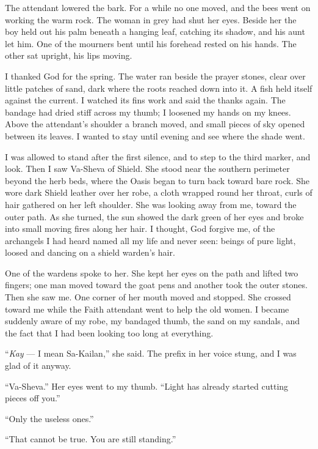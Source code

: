 The attendant lowered the bark. For a while no one moved, and the bees went on working the warm rock. The woman in grey had shut her eyes. Beside her the boy held out his palm beneath a hanging leaf, catching its shadow, and his aunt let him. One of the mourners bent until his forehead rested on his hands. The other sat upright, his lips moving.\par

I thanked God for the spring. The water ran beside the prayer stones, clear over little patches of sand, dark where the roots reached down into it. A fish held itself against the current. I watched its fins work and said the thanks again. The bandage had dried stiff across my thumb; I loosened my hands on my knees. Above the attendant's shoulder a branch moved, and small pieces of sky opened between its leaves. I wanted to stay until evening and see where the shade went.\par

I was allowed to stand after the first silence, and to step to the third marker, and look. Then I saw Va-Sheva of Shield. She stood near the southern perimeter beyond the herb beds, where the Oasis began to turn back toward bare rock. She wore dark Shield leather over her robe, a cloth wrapped round her throat, curls of hair gathered on her left shoulder. She was looking away from me, toward the outer path. As she turned, the sun showed the dark green of her eyes and broke into small moving fires along her hair. I thought, God forgive me, of the archangels I had heard named all my life and never seen: beings of pure light, loosed and dancing on a shield warden's hair. \par

One of the wardens spoke to her. She kept her eyes on the path and lifted two fingers; one man moved toward the goat pens and another took the outer stones. Then she saw me. One corner of her mouth moved and stopped. She crossed toward me while the Faith attendant went to help the old women. I became suddenly aware of my robe, my bandaged thumb, the sand on my sandals, and the fact that I had been looking too long at everything.\par

``\textit{Kay} --- I mean Sa-Kailan,'' she said. The prefix in her voice stung, and I was glad of it anyway.\par
``Va-Sheva.'' 
Her eyes went to my thumb. ``Light has already started cutting pieces off you.''\par
``Only the useless ones.''\par
``That cannot be true. You are still standing.''\par

